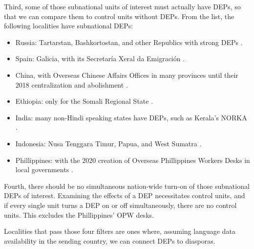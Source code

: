 \documentclass[12pt]{article}
\begin{document}
    Third, some of those subnational units of interest must actually have DEPs, so that we can compare them to control units without DEPs. From the list, the following localities have subnational DEPs:
    \begin{itemize}
        \item Russia: Tartarstan, Bashkortostan, and other Republics with strong DEPs \citep{albina_external_2010}.
        \item Spain: Galicia, with its Secretaría Xeral da Emigración \citep{noauthor_galiciaaberta_nodate}.
        \item China, with Overseas Chinese Affairs Offices in many provinces until their 2018 centralization and abolishment \citep{guotu_chinas_2013}.
        \item Ethiopia: only for the Somali Regional State \citep{berhanu_ethiopian_2019}.
        \item India: many non-Hindi speaking states have DEPs, such as Kerala's NORKA \citep{rajan_assessment_2012}.
        \item Indonesia: Nusa Tenggara Timur, Papua, and West Sumatra \citep{noauthor_dinas_nodate, noauthor_badan_nodate, noauthor_portal_nodate}.
        \item Phillippines: with the 2020 creation of Overseas Phillippines Workers Desks in local governments \citep{noauthor_dilg_nodate}.
    \end{itemize}

     Fourth, there should be no simultaneous nation-wide turn-on of those subnational DEPs of interest. Examining the effects of a DEP necessitates control units, and if every single unit turns a DEP on or off simultaneously, there are no control units. This excludes the Phillippines' OPW desks. 
     
     Localities that pass those four filters are ones where, assuming language data availability in the sending country, we can connect DEPs to diasporas. 
    
\end{document}
